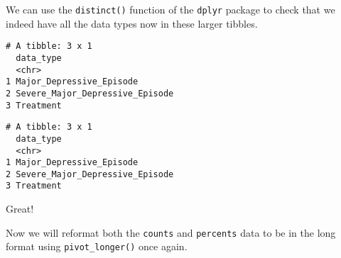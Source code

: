 \documentclass[
]{article}
\newenvironment{Shaded}{\begin{snugshade}}{\end{snugshade}}
\newcommand{\FloatTok}[1]{\textcolor[rgb]{0.00,0.00,0.81}{#1}}
\newcommand{\KeywordTok}[1]{\textcolor[rgb]{0.13,0.29,0.53}{\textbf{#1}}}
\newcommand{\NormalTok}[1]{#1}
\newcommand{\OperatorTok}[1]{\textcolor[rgb]{0.81,0.36,0.00}{\textbf{#1}}}
\newcommand{\StringTok}[1]{\textcolor[rgb]{0.31,0.60,0.02}{#1}}
\begin{document}
We can use the \texttt{distinct()} function of the \texttt{dplyr}
package to check that we indeed have all the data types now in these
larger tibbles.

\begin{Shaded}
\end{Shaded}

\begin{verbatim}
# A tibble: 3 x 1
  data_type                      
  <chr>                          
1 Major_Depressive_Episode       
2 Severe_Major_Depressive_Episode
3 Treatment                      
\end{verbatim}

\begin{Shaded}
\end{Shaded}

\begin{verbatim}
# A tibble: 3 x 1
  data_type                      
  <chr>                          
1 Major_Depressive_Episode       
2 Severe_Major_Depressive_Episode
3 Treatment                      
\end{verbatim}

Great!

Now we will reformat both the \texttt{counts} and \texttt{percents} data
to be in the long format using \texttt{pivot\_longer()} once again.
\end{document}
